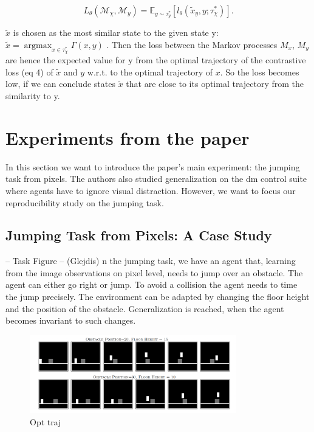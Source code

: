 \documentclass{usiinftr}
\DeclareMathOperator*{\argmax}{argmax}
\begin{document}
\begin{equation}
L_\theta (\mathcal{M}_\chi, \mathcal{M}_y) = \mathbb{E}_{y \sim  \tau_y^*} [l_\theta (\tilde{x}_y, y;\tau_\chi^*)] . 
\end{equation}

$\tilde{x}$ is chosen as the most similar state to the given state y: $\tilde{x} = \argmax_{x \in \tau_\chi ^ *} \Gamma (x,y) $ . Then the loss between the Markov processes $M_x$, $M_y$ are hence the expected value for y from the optimal trajectory of the contrastive loss (eq 4) of $\tilde{x}$ and $y$ w.r.t. to the optimal trajectory of $x$. So the loss becomes low, if we can conclude states $\tilde{x}$ that are close to its optimal trajectory from the similarity to y. 

\section{Experiments from the paper}
In this section we want to introduce the paper's main experiment: the jumping task from pixels. The authors also studied generalization on the dm control suite where agents have to ignore visual distraction. However, we want to focus our reproducibility study on the jumping task.
\subsection{Jumping Task from Pixels: A Case Study}
-- Task Figure -- (Glejdis)
n the jumping task, we have an agent that, learning from the image observations on pixel level, needs to jump over an obstacle. The agent can either go right or jump. To avoid a collision the agent needs to time the jump precisely. The environment can be adapted by changing the floor height and the position of the obstacle. Generalization is reached, when the agent becomes invariant to such changes.

\begin{figure} 
\centering
\includegraphics[width = 0.8\textwidth]{figures/optimal_trajectories.png}
\caption{\label{fig: optimal_trajectories}Opt traj}
\end{figure}
\end{document}
